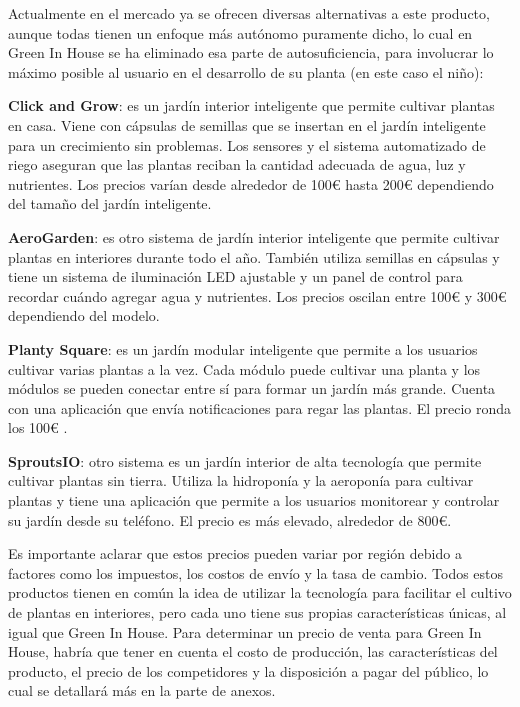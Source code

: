 
Actualmente en el mercado ya se ofrecen diversas alternativas a este producto, aunque todas tienen un enfoque más autónomo puramente dicho, lo cual en Green In House se ha eliminado esa parte de autosuficiencia, para involucrar lo máximo posible al usuario  en el desarrollo de su planta (en este caso el niño):

\textbf{Click and Grow}: es un jardín interior inteligente que permite cultivar plantas en casa. Viene con cápsulas de semillas que se insertan en el jardín inteligente para un crecimiento sin problemas. Los sensores y el sistema automatizado de riego aseguran que las plantas reciban la cantidad adecuada de agua, luz y nutrientes. Los precios varían desde alrededor de 100€ hasta 200€ dependiendo del tamaño del jardín inteligente.

\textbf{AeroGarden}: es otro sistema de jardín interior inteligente que permite cultivar plantas en interiores durante todo el año. También utiliza semillas en cápsulas y tiene un sistema de iluminación LED ajustable y un panel de control para recordar cuándo agregar agua y nutrientes. Los precios oscilan entre 100€ y 300€ dependiendo del modelo.

\textbf{Planty Square}: es un jardín modular inteligente que permite a los usuarios cultivar varias plantas a la vez. Cada módulo puede cultivar una planta y los módulos se pueden conectar entre sí para formar un jardín más grande. Cuenta con una aplicación que envía notificaciones para regar las plantas. El precio ronda los 100€ .

\textbf{SproutsIO}: otro sistema es un jardín interior de alta tecnología que permite cultivar plantas sin tierra. Utiliza la hidroponía y la aeroponía para cultivar plantas y tiene una aplicación que permite a los usuarios monitorear y controlar su jardín desde su teléfono. El precio es más elevado, alrededor de 800€.

Es importante aclarar que estos precios pueden variar por región debido a factores como los impuestos, los costos de envío y la tasa de cambio. Todos estos productos tienen en común la idea de utilizar la tecnología para facilitar el cultivo de plantas en interiores, pero cada uno tiene sus propias características únicas, al igual que Green In House. Para determinar un precio de venta para Green In House, habría que tener en cuenta el costo de producción, las características del producto, el precio de los competidores y la disposición a pagar del público, lo cual se detallará más en la parte de anexos.

